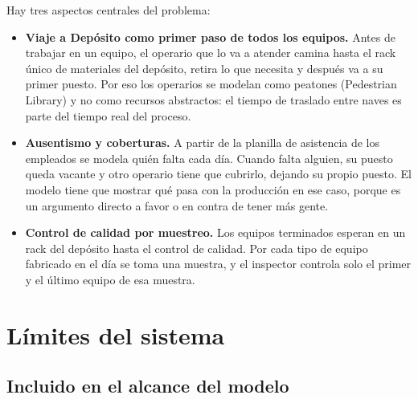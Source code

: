 \documentclass[11pt,a4paper]{article}
\begin{document}
Hay tres aspectos centrales del problema:

\begin{itemize}
  \item \textbf{Viaje a Depósito como primer paso de todos los equipos.} Antes de trabajar en un equipo, el operario que lo va a atender camina hasta el rack único de materiales del depósito, retira lo que necesita y después va a su primer puesto. Por eso los operarios se modelan como peatones (Pedestrian Library) y no como recursos abstractos: el tiempo de traslado entre naves es parte del tiempo real del proceso.
  \item \textbf{Ausentismo y coberturas.} A partir de la planilla de asistencia de los empleados se modela quién falta cada día. Cuando falta alguien, su puesto queda vacante y otro operario tiene que cubrirlo, dejando su propio puesto. El modelo tiene que mostrar qué pasa con la producción en ese caso, porque es un argumento directo a favor o en contra de tener más gente.
  \item \textbf{Control de calidad por muestreo.} Los equipos terminados esperan en un rack del depósito hasta el control de calidad. Por cada tipo de equipo fabricado en el día se toma una muestra, y el inspector controla solo el primer y el último equipo de esa muestra.
\end{itemize}

\section{Límites del sistema}

\subsection*{Incluido en el alcance del modelo}
\end{document}

